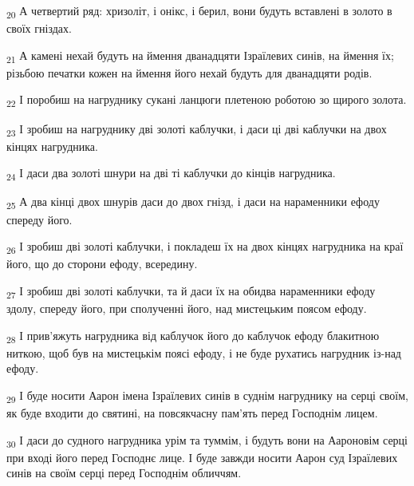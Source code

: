 \begin{tcolorbox}
\textsubscript{20} А четвертий ряд: хризоліт, і онікс, і берил, вони будуть вставлені в золото в своїх гніздах.
\end{tcolorbox}
\begin{tcolorbox}
\textsubscript{21} А камені нехай будуть на ймення дванадцяти Ізраїлевих синів, на ймення їх; різьбою печатки кожен на ймення його нехай будуть для дванадцяти родів.
\end{tcolorbox}
\begin{tcolorbox}
\textsubscript{22} І поробиш на нагруднику сукані ланцюги плетеною роботою зо щирого золота.
\end{tcolorbox}
\begin{tcolorbox}
\textsubscript{23} І зробиш на нагруднику дві золоті каблучки, і даси ці дві каблучки на двох кінцях нагрудника.
\end{tcolorbox}
\begin{tcolorbox}
\textsubscript{24} І даси два золоті шнури на дві ті каблучки до кінців нагрудника.
\end{tcolorbox}
\begin{tcolorbox}
\textsubscript{25} А два кінці двох шнурів даси до двох гнізд, і даси на нараменники ефоду спереду його.
\end{tcolorbox}
\begin{tcolorbox}
\textsubscript{26} І зробиш дві золоті каблучки, і покладеш їх на двох кінцях нагрудника на краї його, що до сторони ефоду, всередину.
\end{tcolorbox}
\begin{tcolorbox}
\textsubscript{27} І зробиш дві золоті каблучки, та й даси їх на обидва нараменники ефоду здолу, спереду його, при сполученні його, над мистецьким поясом ефоду.
\end{tcolorbox}
\begin{tcolorbox}
\textsubscript{28} І прив'яжуть нагрудника від каблучок його до каблучок ефоду блакитною ниткою, щоб був на мистецькім поясі ефоду, і не буде рухатись нагрудник із-над ефоду.
\end{tcolorbox}
\begin{tcolorbox}
\textsubscript{29} І буде носити Аарон імена Ізраїлевих синів в суднім нагруднику на серці своїм, як буде входити до святині, на повсякчасну пам'ять перед Господнім лицем.
\end{tcolorbox}
\begin{tcolorbox}
\textsubscript{30} І даси до судного нагрудника урім та туммім, і будуть вони на Аароновім серці при вході його перед Господнє лице. І буде завжди носити Аарон суд Ізраїлевих синів на своїм серці перед Господнім обличчям.
\end{tcolorbox}
